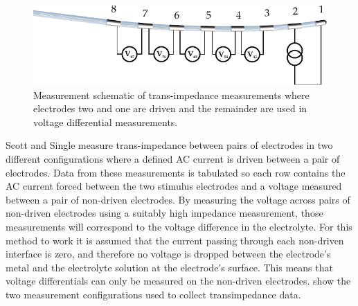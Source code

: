     \begin{figure}
      \centering
      \includegraphics{content/pt2/07-InterfaceModel/graphics/TransimpedanceMeasurements_Stim21}
      \caption{\label{fig:pt2-transimpedanceMeasurementDiagram_21Stim}Measurement schematic of trans-impedance measurements where electrodes two and one are driven and the remainder are used in voltage differential measurements.}
    \end{figure}

    Scott and Single measure trans-impedance between pairs of electrodes in two different configurations where a defined AC current is driven between a pair of electrodes.
    Data from these measurements is tabulated so each row contains the AC current forced between the two stimulus electrodes and a voltage measured between a pair of non-driven electrodes.
    By measuring the voltage across pairs of non-driven electrodes using a suitably high impedance measurement, those measurements will correspond to the voltage difference in the electrolyte.
    For this method to work it is assumed that the current passing through each non-driven interface is zero, and therefore no voltage is dropped between the electrode's metal and the electrolyte solution at the electrode's surface.
    This means that voltage differentials can only be measured on the non-driven electrodes.
     show the two measurement configurations used to collect transimpedance data.


